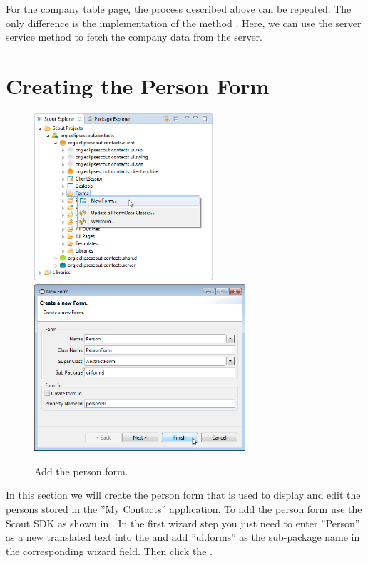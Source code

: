 \documentclass[a4paper,10pt,twoside]{book}
\begin{document}
For the company table page, the process described above can be repeated. 
The only difference is the implementation of the method . 
Here, we can use the server service method  to fetch the company data from the server.



\section{Creating the Person Form}

\begin{figure}
\includegraphics[height=6.2cm]{new_form_person_contextmenu.png} \hspace{5mm}
\includegraphics[height=6.2cm]{new_form_person.png}
\caption{Add the person form.}
\end{figure}

In this section we will create the person form that is used to display and edit the persons stored in the ''My Contacts'' application. 
To add the person form use the Scout SDK  as shown in . 
In the first wizard step you just need to enter ''Person'' as a new translated text into the  and add ''ui.forms'' as the sub-package name in the corresponding wizard field. 
Then click the .
\end{document}
